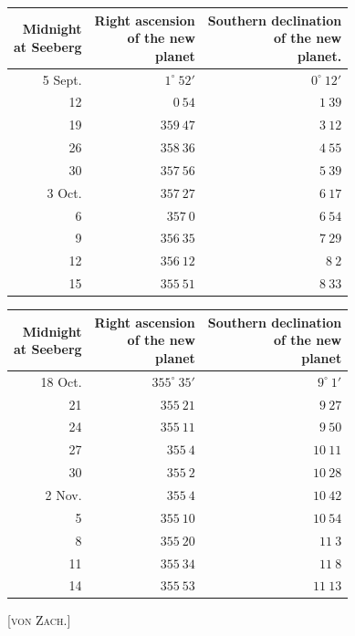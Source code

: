 \begin{center}
\begingroup\fontsize{9}{11}\selectfont\setlength{\tabcolsep}{3pt}\renewcommand{\arraystretch}{1.12}
\begin{tabular}{r|r|r}
\shortstack{Midnight\\at Seeberg} & \shortstack{Right ascension\\of the new\\planet} & \shortstack{Southern declination\\of the new\\planet.} \\ \hline
5 Sept. & $1^\circ\ 52'$ & $0^\circ\ 12'$ \\
12 & $0\ 54$ & $1\ 39$ \\
19 & $359\ 47$ & $3\ 12$ \\
26 & $358\ 36$ & $4\ 55$ \\
30 & $357\ 56$ & $5\ 39$ \\
3 Oct. & $357\ 27$ & $6\ 17$ \\
6 & $357\ 0$ & $6\ 54$ \\
9 & $356\ 35$ & $7\ 29$ \\
12 & $356\ 12$ & $8\ 2$ \\
15 & $355\ 51$ & $8\ 33$ \\
\end{tabular}\endgroup
\end{center}
\begin{center}
\begingroup\fontsize{9}{11}\selectfont\setlength{\tabcolsep}{3pt}\renewcommand{\arraystretch}{1.12}
\begin{tabular}{r|r|r}
\shortstack{Midnight\\at Seeberg} & \shortstack{Right ascension\\of the new\\planet} & \shortstack{Southern declination\\of the new\\planet} \\ \hline
18 Oct. & $355^\circ\ 35'$ & $9^\circ\ 1'$ \\
21 & $355\ 21$ & $9\ 27$ \\
24 & $355\ 11$ & $9\ 50$ \\
27 & $355\ 4$ & $10\ 11$ \\
30 & $355\ 2$ & $10\ 28$ \\
2 Nov. & $355\ 4$ & $10\ 42$ \\
5 & $355\ 10$ & $10\ 54$ \\
8 & $355\ 20$ & $11\ 3$ \\
11 & $355\ 34$ & $11\ 8$ \\
14 & $355\ 53$ & $11\ 13$ \\
\end{tabular}\endgroup
\end{center}

\hfill[\textsc{von Zach.}]

